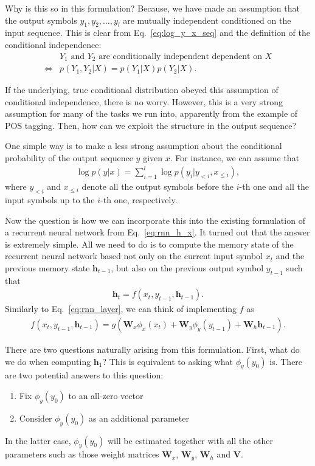 \documentclass{report}
\newcommand{\vect}[1]{\mathbf{#1}}
\newcommand{\matr}[1]{\mathbf{#1}}
\newcommand{\vh}[0]{\vect{h}}
\newcommand{\mW}[0]{\matr{W}}
\newcommand{\mV}[0]{\matr{V}}
\begin{document}
Why is this so in this formulation? Because, we have made an assumption that the
output symbols $y_1, y_2, \ldots, y_l$ are mutually independent conditioned on
the input sequence. This is clear from Eq.~\eqref{eq:log_y_x_seq} and the
definition of the conditional independence:
\begin{align*}
    &\text{$Y_1$ and $Y_2$ are conditionally independent dependent on $X$} \\
    \iff&
    p(Y_1, Y_2|X) = p(Y_1|X)p(Y_2|X).
\end{align*}

If the underlying, true conditional distribution obeyed this assumption of
conditional independence, there is no worry. However, this is a very strong
assumption for many of the tasks we run into, apparently from the example of POS
tagging. Then, how can we exploit the structure in the output sequence?

One simple way is to make a less strong assumption about the conditional
probability of the output sequence $y$ given $x$. For instance, we can assume
that
\begin{align*}
    \log p(y|x) = \sum_{i=1}^l \log p(y_i|y_{<i}, x_{\leq i}),
\end{align*}
where $y_{<i}$ and $x_{\leq i}$ denote all the output symbols before the $i$-th one 
and all the input symbols up to the $i$-th one, respectively.

Now the question is how we can incorporate this into the existing formulation of
a recurrent neural network from Eq.~\eqref{eq:rnn_h_x}. It turned out that the
answer is extremely simple. All we need to do is to compute the memory state of
the recurrent neural network based not only on the current input symbol $x_t$
and the previous memory state $\vh_{t-1}$, but also on the previous output
symbol $y_{t-1}$ such that
\begin{align*}
    \vh_t = f(x_t, y_{t-1}, \vh_{t-1}).
\end{align*}
Similarly to Eq.~\eqref{eq:rnn_layer}, we can think of implementing $f$ as
\begin{align*}
    f(x_t, y_{t-1}, \vh_{t-1}) = g(\mW_x \phi_x(x_t) + \mW_y \phi_y(y_{t-1}) +
    \mW_h \vh_{t-1}).
\end{align*}

There are two questions naturally arising from this formulation. First, what do
we do when computing $\vh_1$? This is equivalent to asking what $\phi_y(y_{0})$
is. There are two potential answers to this question:
\begin{enumerate}
    \itemsep 0em
    \item Fix $\phi_y(y_0)$ to an all-zero vector
    \item Consider $\phi_y(y_0)$ as an additional parameter
\end{enumerate}
In the latter case, $\phi_y(y_0)$ will be estimated together with all the other
parameters such as those weight matrices $\mW_x$, $\mW_y$, $\mW_h$ and $\mV$.
\end{document}
